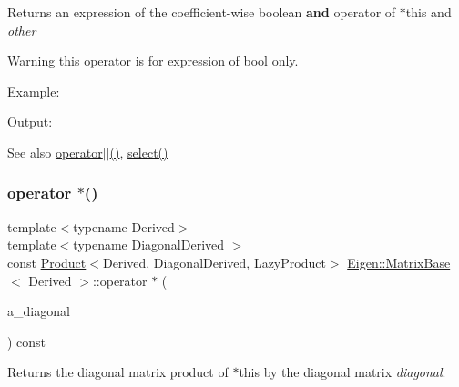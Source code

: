 \begin{DoxyReturn}{Returns}
an expression of the coefficient-\/wise boolean {\bfseries{and}} operator of {\ttfamily $\ast$this} and {\itshape other} 
\end{DoxyReturn}
\begin{DoxyWarning}{Warning}
this operator is for expression of bool only.
\end{DoxyWarning}
Example\+: 
\begin{DoxyCodeInclude}{0}
\end{DoxyCodeInclude}
 Output\+: 
\begin{DoxyVerbInclude}
\end{DoxyVerbInclude}


\begin{DoxySeeAlso}{See also}
\mbox{\hyperlink{class_eigen_1_1_matrix_base_aa93be3d50d662b7bb54bfd346e480675}{operator$\vert$$\vert$()}}, \mbox{\hyperlink{class_eigen_1_1_dense_base_a65e78cfcbc9852e6923bebff4323ddca}{select()}} 
\end{DoxySeeAlso}
\mbox{\label{class_eigen_1_1_matrix_base_a0268033122944d28a71ffc9da2a34304}} 
\subsubsection{\texorpdfstring{operator $\ast$()}{operator *()}\hspace{0.1cm}{\footnotesize\ttfamily [1/2]}}
{\footnotesize\ttfamily template$<$typename Derived$>$ \\
template$<$typename Diagonal\+Derived $>$ \\
const \mbox{\hyperlink{class_eigen_1_1_product}{Product}}$<$Derived, Diagonal\+Derived, Lazy\+Product$>$ \mbox{\hyperlink{class_eigen_1_1_matrix_base}{Eigen\+::\+Matrix\+Base}}$<$ Derived $>$\+::operator $\ast$ (\begin{DoxyParamCaption}\item[{const \mbox{\hyperlink{class_eigen_1_1_diagonal_base}{Diagonal\+Base}}$<$ Diagonal\+Derived $>$ \&}]{a\+\_\+diagonal }\end{DoxyParamCaption}) const\hspace{0.3cm}{\ttfamily [inline]}}

\begin{DoxyReturn}{Returns}
the diagonal matrix product of {\ttfamily $\ast$this} by the diagonal matrix {\itshape diagonal}. 
\end{DoxyReturn}
\mbox{\label{class_eigen_1_1_matrix_base_a5ab97e79b3c117f7ca68d08a3dd430c3}} 
